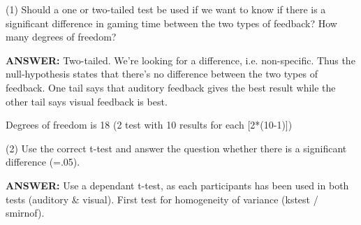 (1) Should a one or two-tailed test be used if we want to know if there is a significant difference in gaming time between the two types of feedback? How many degrees of freedom?

\textbf{ANSWER:} Two-tailed. We're looking for a difference, i.e. non-specific. Thus the null-hypothesis states that there's no difference between the two types of feedback. One tail says that auditory feedback gives the best result while the other tail says visual feedback is best.

Degrees of freedom is 18 (2 test with 10 results for each [2*(10-1)])

(2) Use the correct t-test and answer the question whether there is a significant difference (=.05).

\textbf{ANSWER:} Use a dependant t-test, as each participants has been used in both tests (auditory & visual). First test for homogeneity of variance (kstest / smirnof).